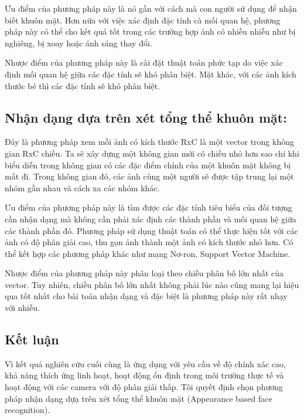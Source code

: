 Ưu điểm của phương pháp này là nó gần với cách mà con người sử dụng để nhận biết
khuôn mặt. Hơn nữa với việc xác định đặc tính cà mối quan hệ, phương pháp này có
thể cho kết quả tốt trong các trường hợp ảnh có nhiều nhiễu như bị nghiêng, bị
xoay hoặc ánh sáng thay đổi.

Nhược điểm của phương pháp này là cài đặt thuật toán phức tạp do việc xác định
mối quan hệ giữa các đặc tính sẽ khó phân biệt. Mặt khác, với các ảnh kích thước
bé thì các đặc tính sẽ khó phân biệt.


\subsection{Nhận dạng dựa trên xét tổng thể khuôn mặt:}

Đây là phương pháp xem mỗi ảnh có kích thước RxC là một vector trong không gian
RxC chiều. Ta sẽ xây dựng một không gian mới có chiều nhỏ hơn sao chi khi biểu diễn
trong không gian có các đặc điểm chính của một khuôn mặt không bị mất đi.
Trong không gian đó, các ảnh cùng một người sẽ được tập trung lại một nhóm
gần nhau và cách xa các nhóm khác.

Ưu điểm của phương pháp này là tìm được các đặc tính tiêu biểu của đối tượng cần nhận
dạng mà không cần phải xác định các thành phần và mối quan hệ giữa các thành phần đó.
Phương pháp sử dụng thuật toán có thể thực hiện tốt với các ảnh có độ phân giải cao,
thu gọn ảnh thành một ảnh có kích thước nhỏ hơn. Có thể kết hợp các phương pháp khác
như mạng Nơ-ron, Support Vector Machine.

Nhược điểm của phương pháp này phân loại theo chiều phân bố lớn nhất của vector.
Tuy nhiên, chiều phân bố lớn nhất không phải lúc nào cũng mang lại hiệu qua
tốt nhất cho bài toán nhận dạng và đặc biệt là phương pháp này rất nhạy với nhiễu.

\subsection{Kết luận}

Vì kết quả nghiên cứu cuối cùng là ứng dụng với yêu cầu về độ chính xác cao, 
khả năng thích ứng linh hoạt, hoạt động ổn định trong môi trường thực tế và 
hoạt động với các camera với độ phân giải thấp. Tôi quyết định chọn phương pháp 
nhận dạng dựạ trên xét tổng thể khuôn mặt (Appearance based face recognition).

